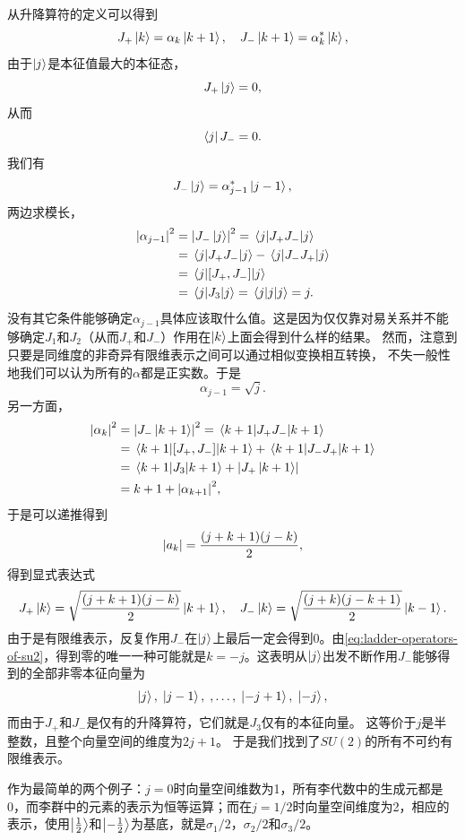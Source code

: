从升降算符的定义可以得到
\[
    J_+ \ket{k} = \alpha_k \ket{k+1}, \quad J_- \ket{k+1} = \alpha_k^* \ket{k},
\]
由于$\ket{j}$是本征值最大的本征态，
\[
    J_+ \ket{j} = 0,
\]
从而
\[
    \bra{j} J_- = 0.
\]
我们有
\[
    J_- \ket{j} = \alpha_{j-1}^* \ket{j-1},
\]
两边求模长，
\[
    \begin{aligned}
        \abs{\alpha_{j-1}}^2 &= \abs{J_- \ket{j}}^2 = \mel{j}{J_+ J_-}{j} \\
        &= \mel{j}{J_+ J_-}{j} - \mel{j}{J_- J_+}{j} \\
        &= \mel{j}{[J_+, J_-]}{j} \\
        &= \mel{j}{J_3}{j} = \mel{j}{j}{j} = j.
    \end{aligned}
\]
没有其它条件能够确定$\alpha_{j-1}$具体应该取什么值。这是因为仅仅靠对易关系并不能够确定$J_1$和$J_2$（从而$J_+$和$J_-$）作用在$\ket{k}$上面会得到什么样的结果。
然而，注意到只要是同维度的非奇异有限维表示之间可以通过相似变换相互转换，%
不失一般性地我们可以认为所有的$\alpha$都是正实数。于是
\[
    \alpha_{j-1} = \sqrt{j}.
\]
另一方面，
\[
    \begin{aligned}
        \abs{\alpha_k}^2 &= \abs{J_- \ket{k+1}}^2 = \mel{k+1}{J_+ J_-}{k+1} \\
        &= \mel{k+1}{[J_+, J_-]}{k+1} + \mel{k+1}{J_- J_+}{k+1} \\
        &= \mel{k+1}{J_3}{k+1} + \abs{J_+ \ket{k+1}} \\
        &= k+1 + \abs{\alpha_{k+1}}^2,
    \end{aligned} 
\]
于是可以递推得到
\[
    \abs{a_k} = \frac{(j+k+1)(j-k)}{2},
\]
得到显式表达式
\begin{equation}
    J_+ \ket{k} = \sqrt{\frac{(j+k+1)(j-k)}{2}} \ket{k+1}, \quad J_- \ket{k} = \sqrt{\frac{(j+k)(j-k+1)}{2}} \ket{k-1}.
    \label{eq:ladder-operators-of-su2}
\end{equation}
由于是有限维表示，反复作用$J_-$在$\ket{j}$上最后一定会得到$0$。由\eqref{eq:ladder-operators-of-su2}，得到零的唯一一种可能就是$k=-j$。这表明从$\ket{j}$出发不断作用$J_-$能够得到的全部非零本征向量为
\[
    \ket{j}, \; \ket{j-1}, \; , \ldots, \; \ket{-j+1}, \; \ket{-j},
\]
而由于$J_+$和$J_-$是仅有的升降算符，它们就是$J_3$仅有的本征向量。
这等价于$j$是半整数，且整个向量空间的维度为$2j+1$。
于是我们找到了$SU(2)$的所有不可约有限维表示。

作为最简单的两个例子：$j=0$时向量空间维数为1，所有李代数中的生成元都是0，而李群中的元素的表示为恒等运算；而在$j=1/2$时向量空间维度为2，相应的表示，使用$\ket{\frac{1}{2}}$和$\ket{-\frac{1}{2}}$为基底，就是$\sigma_1 / 2$，$\sigma_2 / 2$和$\sigma_3 / 2$。

